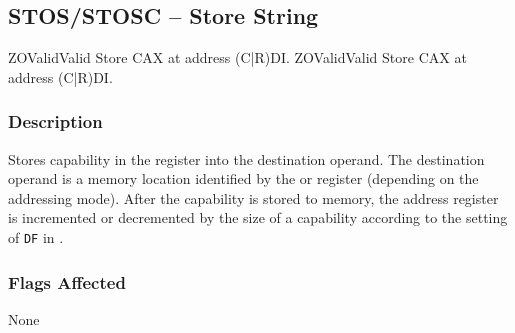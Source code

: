 \clearpage
{}
{}
\subsection*{STOS/STOSC -- Store String}

\begin{x86opcodetable}
  {ZO}{Valid}{Valid}
  {Store CAX at address (C|R)DI.}
  {ZO}{Valid}{Valid}
  {Store CAX at address (C|R)DI.}
\end{x86opcodetable}

\begin{x86opentable}
\end{x86opentable}

\subsubsection*{Description}

Stores capability in the \CAX{} register into the destination operand.
The destination operand is a memory location identified by the \RDI{}
or \CDI{} register (depending on the addressing mode).  After the
capability is stored to memory, the address register is incremented or
decremented by the size of a capability according to the setting of
\texttt{DF} in \RFLAGS{}.

\subsubsection*{Flags Affected}

None
